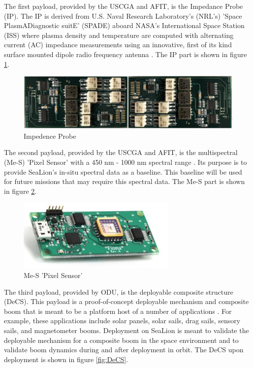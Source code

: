 \documentclass[journal,article,submit,pdftex,moreauthors]{Definitions/mdpi}
\begin{document}
The first payload, provided by the USCGA and AFIT, is the Impedance Probe (IP).  The IP is derived from U.S. Naval Research Laboratory's (NRL's) 'Space PlasmADiagnostic suitE' (SPADE) aboard NASA's International Space Station (ISS) where plasma density and temperature are computed with alternating current (AC) impedance measurements using an innovative, first of its kind surface mounted dipole radio frequency antenna \cite{sealion_cdr}.  The IP part is shown in figure \ref{fig:IP}.

\begin{figure}[H]
    \includegraphics[width=13.75 cm]{assets/impedence.png}
    \caption{Impedence Probe}
	\label{fig:IP}
    \end{figure}
	\noindent   
\unskip

The second payload, provided by the USCGA and AFIT, is the multispectral (Me-S) 'Pixel Sensor' with a 450 nm - 1000 nm spectral range \cite{sealion_cdr}.  Its purpose is to provide SeaLion's in-situ spectral data as a baseline.  This baseline will be used for future missions that may require this spectral data.  The Me-S part is shown in figure \ref{fig:Me-S}. 

\begin{figure}[H]
    \includegraphics{assets/spectral.png}
    \caption{Me-S 'Pixel Sensor'}
	\label{fig:Me-S}
    \end{figure}
	\noindent   
\unskip

The third payload, provided by ODU, is the deployable composite structure (DeCS).  This payload is a proof-of-concept deployable mechanism and composite boom that is meant to be a platform host of a number of applications \cite{sealion_cdr}.  For example, these applications include solar panels, solar sails, drag sails, sensory sails, and magnetometer booms.  Deployment on SeaLion is meant to validate the deployable mechanism for a composite boom in the space environment and to validate boom dynamics during and after deployment in orbit.  The DeCS upon deployment is shown in figure \ref{fig:DeCS}.
\end{document}
